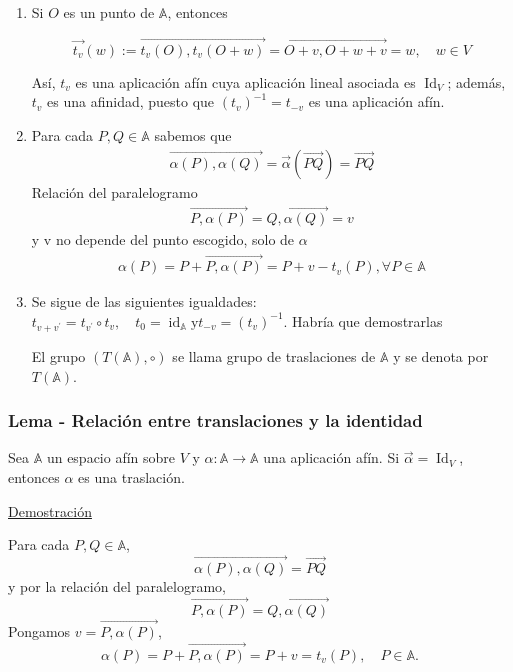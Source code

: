 \documentclass[12pt, a4paper, ones, notitlepage, openany,titlepage]{article}
\newcommand{\demostracion}{\noindent\underline{Demostración}}
\newcommand{\identidad}{\operatorname{Id}}
\begin{document}
\begin{enumerate}[label=(\arabic*)]
\item Si $O$ es un punto de $\mathbb{A}$, entonces

$$
\overrightarrow{t_{v}}(w):=\overrightarrow{t_{v}(O), t_{v}(O+w)}=\overrightarrow{O+v, O+w+v}=w, \quad w \in V
$$

Así, $t_{v}$ es una aplicación afín cuya aplicación lineal asociada es $\identidad_V$; además, $t_{v}$ es una afinidad, puesto que $\left(t_{v}\right)^{-1}=t_{-v}$ es una aplicación afín.

\item Para cada $P,Q\in\mathbb{A}$ sabemos que
\begin{gather*}
	\overrightarrow{\alpha(P),\alpha(Q)}=\overrightarrow{\alpha}(\overrightarrow{PQ}) = \overrightarrow{PQ}
\end{gather*}
Relación del paralelogramo
\begin{gather*}
	\overrightarrow{P,\alpha(P)} = \overrightarrow{Q,\alpha(Q)} = v
\end{gather*}
y v no depende del punto escogido, solo de $\alpha$
\begin{gather*}
	\alpha(P) = P+\overrightarrow{P,\alpha(P)} = P + v - t_{v}(P),\forall P\in\mathbb{A}
\end{gather*}

\item Se sigue de las siguientes igualdades: $t_{v+v^{\prime}}=t_{v^{\prime}} \circ t_{v}, \quad t_{0}=\operatorname{id}_{\mathbb{A}} \mathrm{y} t_{-v}=\left(t_{v}\right)^{-1}$. Habría que demostrarlas

El grupo $(T(\mathbb{A}), \circ)$ se llama grupo de traslaciones de $\mathbb{A}$ y se denota por $T(\mathbb{A})$.

\end{enumerate}


\subsubsection{Lema - Relación entre translaciones y la identidad}
Sea $\mathbb{A}$ un espacio afín sobre $V$ y $\alpha: \mathbb{A} \rightarrow \mathbb{A}$ una aplicación afín. Si $\overrightarrow{\alpha}=\operatorname{Id}_{V}$, entonces $\alpha$ es una traslación.

\demostracion

\noindent Para cada $P, Q \in \mathbb{A}$,
$$
\overrightarrow{\alpha(P), \alpha(Q)}=\overrightarrow{P Q}
$$
y por la relación del paralelogramo,
$$
\overrightarrow{P, \alpha(P)}=\overrightarrow{Q, \alpha(Q)}
$$
Pongamos $v=\overrightarrow{P, \alpha(P)}$,
$$
\alpha(P)=P+\overrightarrow{P, \alpha(P)}=P+v=t_{v}(P), \quad P \in \mathbb{A} .
$$
\end{document}
